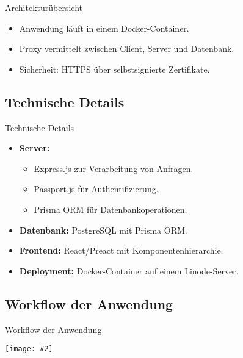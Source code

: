 \documentclass{beamer}
\newcommand{\centfig}[2]{\begin{center}
  \texttt{[image: \#2]}
  \end{center}}
\begin{document}
\begin{frame}{Architekturübersicht}
    \begin{itemize}
        \item<1-> Anwendung läuft in einem Docker-Container.
        \item<2-> Proxy vermittelt zwischen Client, Server und Datenbank.
        \item<3-> Sicherheit: HTTPS über selbstsignierte Zertifikate.
    \end{itemize}
\end{frame}

\subsection{Technische Details}
\begin{frame}{Technische Details}
    \begin{itemize}
        \item<1-> \textbf{Server:}
        \begin{itemize}
            \item Express.js zur Verarbeitung von Anfragen.
            \item Passport.js für Authentifizierung.
            \item Prisma ORM für Datenbankoperationen.
        \end{itemize}
        \item<2-> \textbf{Datenbank:} PostgreSQL mit Prisma ORM.
        \item<3-> \textbf{Frontend:} React/Preact mit Komponentenhierarchie.
        \item<4-> \textbf{Deployment:} Docker-Container auf einem Linode-Server.
    \end{itemize}
\end{frame}

\subsection{Workflow der Anwendung}
\begin{frame}{Workflow der Anwendung}
    \centfig{0.7}{web-app-workflow.png}
\end{frame}
\end{document}
